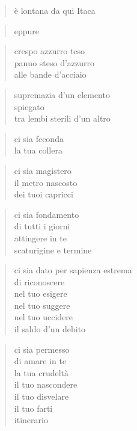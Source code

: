 	\begin{verse}
		è lontana da qui Itaca
	\end{verse}

	\begin{verse}
		eppure
	\end{verse}

\clearpage



	\begin{verse}
		crespo azzurro teso\\
		panno steso d’azzurro\\
		alle bande d’acciaio
	\end{verse}

	\begin{verse}
		supremazia d’un elemento\\
		spiegato\\
		tra lembi sterili d’un altro
	\end{verse}

	\begin{verse}
		ci sia feconda\\
		la tua collera
	\end{verse}

	\begin{verse}
		ci sia magistero\\
		il metro nascosto\\
		dei tuoi capricci
	\end{verse}

	\begin{verse}
		ci sia fondamento\\
		di tutti i giorni\\
		attingere in te\\
		scaturigine e termine
	\end{verse}

	\begin{verse}
		ci sia dato
		per sapienza estrema\\
		di riconoscere\\
		nel tuo esigere\\
		nel tuo suggere\\
		nel tuo uccidere\\
		il saldo d’un debito
	\end{verse}

	\begin{verse}
		ci sia permesso\\
		di amare in te\\
		la tua crudeltà\\
		il tuo nascondere\\
		il tuo disvelare\\
		il tuo farti\\
		itinerario
	\end{verse}

